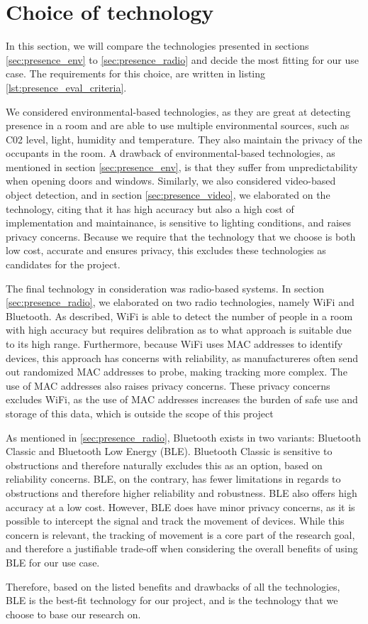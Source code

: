 \section{Choice of technology}
In this section, we will compare the technologies presented in sections \ref{sec:presence_env} to \ref{sec:presence_radio} and decide the most fitting for our use case. 
The requirements for this choice, are written in listing \ref{lst:presence_eval_criteria}.

We considered environmental-based technologies, as they are great at detecting presence in a room and are able to use multiple environmental sources, such as C02 level, light, humidity and temperature. 
They also maintain the privacy of the occupants in the room. 
A drawback of environmental-based technologies, as mentioned in section \ref{sec:presence_env}, is that they suffer from unpredictability when opening doors and windows. 
Similarly, we also considered video-based object detection, and in section \ref{sec:presence_video}, we elaborated on the technology, citing that it has high accuracy but also a high cost of implementation and maintainance, is sensitive to lighting conditions, and raises privacy concerns.
Because we require that the technology that we choose is both low cost, accurate and ensures privacy, this excludes these technologies as candidates for the project.

The final technology in consideration was radio-based systems. In section \ref{sec:presence_radio}, we elaborated on two radio technologies, namely WiFi and Bluetooth. 
As described, WiFi is able to detect the number of people in a room with high accuracy but requires delibration as to what approach is suitable due to its high range. 
Furthermore, because WiFi uses MAC addresses to identify devices, this approach has concerns with reliability, as manufactureres often send out randomized MAC addresses to probe, making tracking more complex. 
The use of MAC addresses also raises privacy concerns. 
These privacy concerns excludes WiFi, as the use of MAC addresses increases the burden of safe use and storage of this data, which is outside the scope of this project

As mentioned in \ref{sec:presence_radio}, Bluetooth exists in two variants: Bluetooth Classic and Bluetooth Low Energy (BLE). Bluetooth Classic is sensitive to obstructions and therefore naturally excludes this as an option, based on reliability concerns. 
BLE, on the contrary, has fewer limitations in regards to obstructions and therefore higher reliability and robustness.
BLE also offers high accuracy at a low cost.
However, BLE does have minor privacy concerns, as it is possible to intercept the signal and track the movement of devices.
While this concern is relevant, the tracking of movement is a core part of the research goal, and therefore a justifiable trade-off when considering the overall benefits of using BLE for our use case.

Therefore, based on the listed benefits and drawbacks of all the technologies, BLE is the best-fit technology for our project, and is the technology that we choose to base our research on.